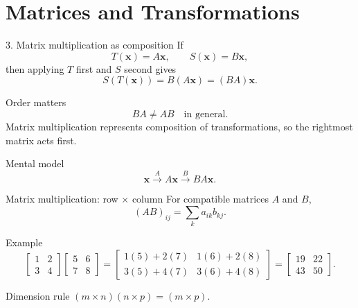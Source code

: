 \documentclass[aspectratio=169,11pt]{beamer}
\newcommand{\vect}[1]{\bm{#1}}
\begin{document}
\section{Matrices and Transformations}
\begin{frame}{3. Matrix multiplication as composition}
If
\[
T(\vect x)=A\vect x,\qquad S(\vect x)=B\vect x,
\]
then applying $T$ first and $S$ second gives
\[
S(T(\vect x))=B(A\vect x)=(BA)\vect x.
\]
\begin{alertblock}{Order matters}
\[
BA\neq AB\quad\text{in general.}
\]
Matrix multiplication represents composition of transformations, so the rightmost matrix acts first.
\end{alertblock}
\begin{exampleblock}{Mental model}
\[
\vect x \xrightarrow{\;A\;} A\vect x
\xrightarrow{\;B\;} BA\vect x.
\]
\end{exampleblock}
\end{frame}

\begin{frame}{Matrix multiplication: row $\times$ column}
For compatible matrices $A$ and $B$,
\[
(AB)_{ij}=\sum_k a_{ik}b_{kj}.
\]
\begin{exampleblock}{Example}
\[
\begin{bmatrix}1&2\\3&4\end{bmatrix}
\begin{bmatrix}5&6\\7&8\end{bmatrix}
=
\begin{bmatrix}
1(5)+2(7)&1(6)+2(8)\\
3(5)+4(7)&3(6)+4(8)
\end{bmatrix}
=
\begin{bmatrix}19&22\\43&50\end{bmatrix}.
\]
\end{exampleblock}
\begin{block}{Dimension rule}
$(m\times n)(n\times p)=(m\times p)$.
\end{block}
\end{frame}
\end{document}

